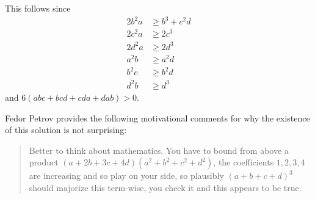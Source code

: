 \documentclass[11pt]{scrartcl}
\begin{document}
This follows since
\begin{align*}
  2b^2a &\ge b^3 + c^2d \\
  2c^2a &\ge 2c^3 \\
  2d^2a &\ge 2d^3  \\
  a^2b &\ge a^2d \\
  b^2c &\ge b^2d \\
  d^2b &\ge d^3
\end{align*}
and $6(abc+bcd+cda+dab) > 0$.

\begin{remark*}
  Fedor Petrov provides the following motivational comments
  for why the existence of this solution is not surprising:
  \begin{quote}
    Better to think about mathematics.
    You have to bound from above a product $(a+2b+3c+4d)(a^2+b^2+c^2+d^2)$,
    the coefficients $1,2,3,4$ are increasing and so play on your side,
    so plausibly $(a+b+c+d)^3$ should majorize this term-wise,
    you check it and this appears to be true.
  \end{quote}
\end{remark*}
\pagebreak
\end{document}
